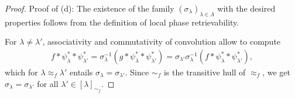 \documentclass[10pt,a4paper]{amsart}
\begin{document}
\begin{proof}
	
	Proof of (d): 
	The existence of the family $(\sigma_\lambda)_{\lambda \in \Lambda}$ with the desired properties follows from the definition of local phase retrievability. 
	
	For $\lambda \not= \lambda'$, associativity and commutativity of convolution allow to compute
	\begin{align*}
		f \ast \psi_\lambda^\ast \ast \psi_{\lambda'}^\ast = \sigma_\lambda^{-1} (g \ast \psi_\lambda^\ast \ast \psi_{\lambda'}^\ast) 
		= \sigma_{\lambda'} \sigma_{\lambda}^{-1} (f \ast \psi_\lambda^\ast \ast \psi_{\lambda'}^\ast),
	\end{align*}
	which for $\lambda \approx_f \lambda'$ entails $\sigma_\lambda = \sigma_{\lambda'}$. Since $\sim_f$ is the transitive hull of $\approx_f$, we get $\sigma_\lambda = \sigma_{\lambda'}$ for all $\lambda' \in [\lambda]_{\sim_f}$. 
\end{proof}
\end{document}
